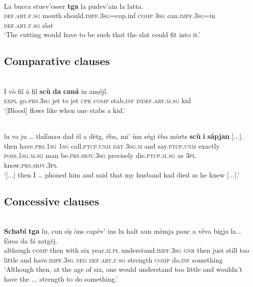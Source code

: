 \ea
\label{}
\\
\gll   La bucca stuev'esser \textbf{tga} la pudev'ain la latta.\\
     \textsc{def.art.f.sg} mouth should.\textsc{impf.3sg}{=cop.inf} \textsc{comp} \textsc{3sg} can.\textsc{impf.3sg}=in \textsc{def.art.f.sg} slat\\
\glt `The cutting would have to be such that the slat could fit into it.'
\z




\subsection{Comparative clauses}

\ea\label{}
\\
\gll  I vò fil á fil \textbf{scù} \textbf{da} \textbf{caná} in anṣéjl.\\
    \textsc{expl} go.\textsc{prs.3sg} jet to jet \textsc{cpr} \textsc{comp} stab.\textsc{inf} \textsc{indef.art.m.sg} kid \\
\glt `[Blood] flows like when one stabs a kid.'
\z

\ea
\label{}
\\
\gll  [...] lu va ju … tlafònau dad èl a détg, éba, mi' ùm ségi èba mòrts \textbf{scù} \textbf{i} \textbf{sápjan} [...].\\
{} then have.\textsc{prs.1sg} \textsc{1sg} {} call.\textsc{ptcp.unm} \textsc{dat} \textsc{3sg.m} and say.\textsc{ptcp.unm} exactly \textsc{poss.1sg.m.sg} man be.\textsc{prs.sbjv.3sg} precisely die.\textsc{ptcp.m.sg} as \textsc{3pl} know.\textsc{prs.sbjv.3pl}\\ 
\glt `[...] then I … phoned him and said that my husband had died as he knew [...].'
\z



\subsection{Concessive clauses}

\ea
\label{}
\\
\gll \textbf{Schabi} \textbf{tga} lu, cun siṣ òns capév’ ins lu halt aun mèmja pauc a vèva bigja la... fòrsa\footnotemark{} da fá zatgéj.   \\
although \textsc{comp} then with six year.\textsc{m.pl} understand.\textsc{impf.3sg} \textsc{gnr} then just still too little and have.\textsc{impf.3sg} \textsc{neg} \textsc{def.art.f.sg} strength \textsc{comp} do.\textsc{inf} something\\
\glt `Although then, at the age of six, one would understand too little and wouldn’t have the ... strength to do something.'
\z



